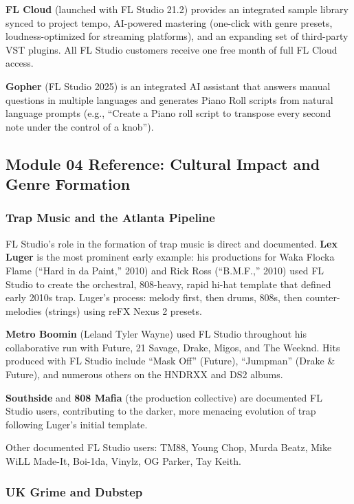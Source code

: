 \documentclass[11pt,letterpaper]{article}
\begin{document}
\textbf{FL Cloud} (launched with FL Studio 21.2) provides an integrated sample library synced to project tempo, AI-powered mastering (one-click with genre presets, loudness-optimized for streaming platforms), and an expanding set of third-party VST plugins. All FL Studio customers receive one free month of full FL Cloud access.

\textbf{Gopher} (FL Studio 2025) is an integrated AI assistant that answers manual questions in multiple languages and generates Piano Roll scripts from natural language prompts (e.g., ``Create a Piano roll script to transpose every second note under the control of a knob'').

\subsection{Module 04 Reference: Cultural Impact and Genre Formation}

\subsubsection{Trap Music and the Atlanta Pipeline}

FL Studio's role in the formation of trap music is direct and documented. \textbf{Lex Luger} is the most prominent early example: his productions for Waka Flocka Flame (``Hard in da Paint,'' 2010) and Rick Ross (``B.M.F.,'' 2010) used FL Studio to create the orchestral, 808-heavy, rapid hi-hat template that defined early 2010s trap. Luger's process: melody first, then drums, 808s, then counter-melodies (strings) using reFX Nexus 2 presets.

\textbf{Metro Boomin} (Leland Tyler Wayne) used FL Studio throughout his collaborative run with Future, 21 Savage, Drake, Migos, and The Weeknd. Hits produced with FL Studio include ``Mask Off'' (Future), ``Jumpman'' (Drake \& Future), and numerous others on the HNDRXX and DS2 albums.

\textbf{Southside} and \textbf{808 Mafia} (the production collective) are documented FL Studio users, contributing to the darker, more menacing evolution of trap following Luger's initial template.

Other documented FL Studio users: TM88, Young Chop, Murda Beatz, Mike WiLL Made-It, Boi-1da, Vinylz, OG Parker, Tay Keith.

\subsubsection{UK Grime and Dubstep}
\end{document}
